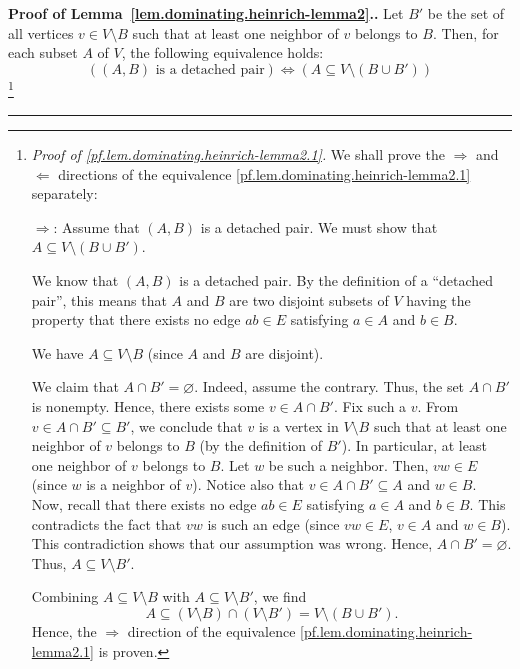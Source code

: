 \documentclass[numbers=enddot,12pt,final,onecolumn,notitlepage]{scrartcl}%
\theoremstyle{definition}
\newenvironment{proof}[1][Proof]{\noindent\textbf{#1.} }{\ \rule{0.5em}{0.5em}}
\newcommand{\tup}[1]{\left( #1 \right)}
\begin{document}
\begin{proof}[Proof of Lemma~\ref{lem.dominating.heinrich-lemma2}.]
Let $B'$ be the set of all vertices $v \in V \setminus B$ such
that at least one neighbor of $v$ belongs to $B$. Then, for each
subset $A$ of $V$, the following equivalence holds:
\begin{equation}
\left( \tup{A, B} \text{ is a detached pair} \right)
\Longleftrightarrow
\left( A \subseteq V \setminus \tup{B \cup B'} \right)
\label{pf.lem.dominating.heinrich-lemma2.1}
\end{equation}
\footnote{\textit{Proof of
\eqref{pf.lem.dominating.heinrich-lemma2.1}.} We shall prove the
$\Longrightarrow$ and $\Longleftarrow$ directions of the equivalence
\eqref{pf.lem.dominating.heinrich-lemma2.1} separately:

$\Longrightarrow$: Assume that $\tup{A, B}$ is a detached pair. We
must show that $A \subseteq V \setminus \tup{B \cup B'}$.

We know that $\tup{A, B}$ is a detached pair. By the definition of a
``detached pair'', this means that $A$ and $B$ are two disjoint
subsets of $V$ having the property that there exists no edge
$ab \in E$ satisfying $a \in A$ and $b \in B$.

We have $A \subseteq V \setminus B$ (since $A$ and $B$ are
disjoint).

We claim that $A \cap B' = \varnothing$. Indeed, assume the contrary.
Thus, the set $A \cap B'$ is nonempty. Hence, there exists some
$v \in A \cap B'$. Fix such a $v$.
From $v \in A \cap B' \subseteq B'$, we conclude that $v$ is a vertex
in $V \setminus B$ such that at least one neighbor of $v$
belongs to $B$ (by the definition of $B'$). In particular, at least
one neighbor of $v$ belongs to $B$. Let $w$ be such a neighbor. Then,
$vw \in E$ (since $w$ is a neighbor of $v$). Notice also that
$v \in A \cap B' \subseteq A$ and $w \in B$.
Now, recall that there exists no edge $ab \in E$ satisfying $a \in A$
and $b \in B$. This contradicts the fact that $vw$ is such an edge
(since $vw \in E$, $v \in A$ and $w \in B$). This contradiction shows
that our assumption was wrong. Hence, $A \cap B' = \varnothing$.
Thus, $A \subseteq V \setminus B'$.

Combining $A \subseteq V \setminus B$ with
$A \subseteq V \setminus B'$, we find
\[
A \subseteq \tup{V \setminus B} \cap \tup{V \setminus B'}
  = V \setminus \tup{B \cup B'} .
\]
Hence, the $\Longrightarrow$ direction of the equivalence
\eqref{pf.lem.dominating.heinrich-lemma2.1} is proven.

}
\end{proof}
\end{document}
